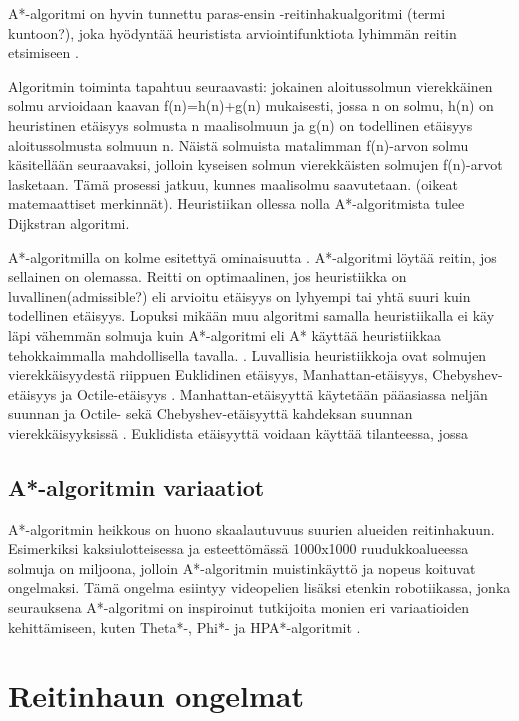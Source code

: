 \documentclass[utf8]{gradu3}
\begin{document}
A*-algoritmi on hyvin tunnettu paras-ensin -reitinhakualgoritmi (termi kuntoon?), joka hyödyntää heuristista arviointifunktiota lyhimmän reitin etsimiseen \parencite{cui2011based,duchovn2014path}.

Algoritmin toiminta tapahtuu seuraavasti: jokainen aloitussolmun vierekkäinen solmu arvioidaan kaavan f(n)=h(n)+g(n) mukaisesti, jossa n on solmu, h(n) on heuristinen etäisyys solmusta n maalisolmuun ja g(n) on todellinen etäisyys aloitussolmusta solmuun n. Näistä solmuista matalimman f(n)-arvon solmu käsitellään seuraavaksi, jolloin kyseisen solmun vierekkäisten solmujen f(n)-arvot lasketaan. Tämä prosessi jatkuu, kunnes maalisolmu saavutetaan. (oikeat matemaattiset merkinnät). Heuristiikan ollessa nolla A*-algoritmista tulee Dijkstran algoritmi.

A*-algoritmilla on kolme esitettyä ominaisuutta \parencite{hart1968formal}. A*-algoritmi löytää reitin, jos sellainen on olemassa. Reitti on optimaalinen, jos heuristiikka on luvallinen(admissible?) eli arvioitu etäisyys on lyhyempi tai yhtä suuri kuin todellinen etäisyys. Lopuksi mikään muu algoritmi samalla heuristiikalla ei käy läpi vähemmän solmuja kuin A*-algoritmi eli A* käyttää heuristiikkaa tehokkaimmalla mahdollisella tavalla. \parencite{hart1968formal,cui2011based}. Luvallisia heuristiikkoja ovat solmujen vierekkäisyydestä riippuen Euklidinen etäisyys, Manhattan-etäisyys, Chebyshev-etäisyys ja Octile-etäisyys \parencite{duchovn2014path,botea2013pathfinding}. Manhattan-etäisyyttä käytetään pääasiassa neljän suunnan ja Octile- sekä Chebyshev-etäisyyttä kahdeksan suunnan vierekkäisyyksissä \parencite{botea2013pathfinding}. Euklidista etäisyyttä voidaan käyttää tilanteessa, jossa 

\subsection{A*-algoritmin variaatiot}

A*-algoritmin heikkous on huono skaalautuvuus suurien alueiden reitinhakuun. Esimerkiksi kaksiulotteisessa ja esteettömässä 1000x1000 ruudukkoalueessa solmuja on miljoona, jolloin A*-algoritmin muistinkäyttö ja nopeus koituvat ongelmaksi. \parencite{cui2011based,duchovn2014path} Tämä ongelma esiintyy videopelien lisäksi etenkin robotiikassa, jonka seurauksena A*-algoritmi on inspiroinut tutkijoita monien eri variaatioiden kehittämiseen, kuten Theta*-, Phi*- ja HPA*-algoritmit \parencite{duchovn2014path}.

\section{Reitinhaun ongelmat}
\end{document}
